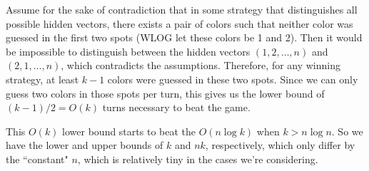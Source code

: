 \documentclass[12pt, a4paper]{article}
\begin{document}
Assume for the sake of contradiction that in some strategy that distinguishes all
possible hidden vectors, there exists a pair of colors such that neither color was
guessed in the first two spots (WLOG let these colors be 1 and 2). Then it would be
impossible to distinguish between the hidden vectors $(1,2,\ldots,n)$ and
$(2,1,\ldots,n)$, which contradicts the assumptions. Therefore, for any winning
strategy, at least $k-1$ colors were guessed in these two spots. Since we can only
guess two colors in those spots per turn, this gives us the lower bound of
$(k-1)/2 =O(k)$ turns necessary to beat the game.

This $O(k)$ lower bound starts to beat the $O(n \log k)$ when 
$k > n \log n$. So we have the lower and upper bounds of $k$ and $nk$, respectively, 
which only
differ by the ``constant" $n$, which is relatively tiny in the cases we're considering.

\clearpage
\printbibliography
\end{document}
